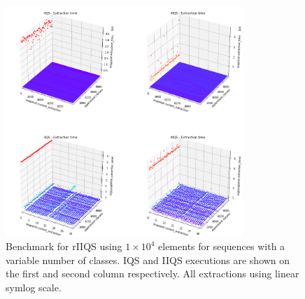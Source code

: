 \begin{figure}[p]
    \centering
    \includegraphics[width=0.8\textwidth]{./fragments/05_workhorse_experiment/images/01_basebenchmark_05_classes.png}
    \caption{Benchmark for rIIQS using $1\times10^4$ elements for sequences with a variable number of classes. IQS and IIQS executions are shown on the first and second column respectively. All extractions using linear symlog scale.}
    \label{FIG:WORKHORSE_BENCHMARK_05}
\end{figure}


